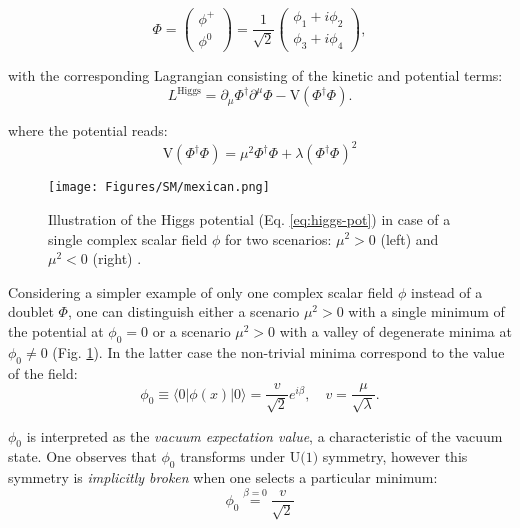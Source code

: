 \begin{equation}
    \Phi = \left(\begin{matrix} \phi^+ \\ \phi^0 \end{matrix}\right)  = \dfrac{1}{\sqrt{2}} \left(\begin{matrix} \phi_1 + i\phi_2 \\ \phi_3 + i\phi_4 \end{matrix}\right),
\end{equation}

with the corresponding Lagrangian consisting of the kinetic and potential terms:
\begin{equation}\label{eq:lagr-h}
    L^\text{Higgs} = \partial_\mu\Phi^\dag \partial^\mu\Phi - \text{V}(\Phi^\dag\Phi).
\end{equation}

where the potential reads:
\begin{equation}\label{eq:higgs-pot}
    \text{V}(\Phi^\dag\Phi) = \mu^2\Phi^\dag\Phi + \lambda (\Phi^\dag\Phi)^2
\end{equation}

\begin{figure}[t!]
    \centering
    \texttt{[image: Figures/SM/mexican.png]}
    \caption{Illustration of the Higgs potential (Eq. \ref{eq:higgs-pot}) in case of a single complex scalar field $\phi$ for two scenarios: $\mu^2 > 0$ (left) and $\mu^2 < 0$ (right) \cite{Mulders:2019vhb}.}
    \label{fig:mexican}
\end{figure}

Considering a simpler example of only one complex scalar field $\phi$ instead of a \sutwo doublet $\Phi$, one can distinguish either a scenario $\mu^2 > 0$ with a single minimum of the potential at $\phi_0=0$ or a scenario $\mu^2 > 0$ with a valley of degenerate minima at $\phi_0 \neq 0$ (Fig. \ref{fig:mexican}). In the latter case the non-trivial minima correspond to the value of the field:
\begin{equation}\label{eq:vev-0}
    \phi_0 \equiv \langle 0 | \phi(x) | 0 \rangle = \dfrac{v}{\sqrt{2}}e^{i\beta}, \quad v = \dfrac{\mu}{\sqrt{\lambda}}.
\end{equation}

$\phi_0$ is interpreted as the \textit{vacuum expectation value}, a characteristic of the vacuum state. One observes that $\phi_0$ transforms under $\text{U(1)}$ symmetry, however this symmetry is \textit{implicitly broken} when one selects a particular minimum:
\begin{equation}
    \phi_0 \stackrel{\beta=0}{=} \dfrac{v}{\sqrt{2}} 
\end{equation}

